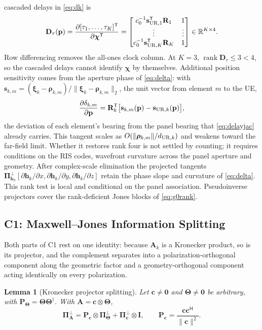 \documentclass[letterpaper,journal]{IEEEtran}
\newtheorem{lemma}{Lemma}
\newcommand{\R}{\mathbb{R}}
\newcommand{\bp}{\mathbf{p}}
\newcommand{\bc}{\mathbf{c}}
\newcommand{\bh}{\mathbf{h}}
\newcommand{\bs}{\mathbf{s}}
\newcommand{\bA}{\mathbf{A}}
\newcommand{\bD}{\mathbf{D}}
\newcommand{\bI}{\mathbf{I}}
\newcommand{\bP}{\mathbf{P}}
\newcommand{\bR}{\mathbf{R}}
\newcommand{\bTheta}{\boldsymbol{\Theta}}
\newcommand{\bPi}{\boldsymbol{\Pi}}
\newcommand{\brho}{\boldsymbol{\rho}}
\newcommand{\bchi}{\boldsymbol{\chi}}
\newcommand{\bxi}{\boldsymbol{\xi}}
\newcommand{\rank}{\operatorname{rank}}
\begin{document}
cascaded delays in \eqref{eq:dk} is
\begin{equation}
	\bD_\tau(\bp)
	=\frac{\partial[\tau_1,\ldots,\tau_K]^{\mathsf T}}
	{\partial\bchi^{\mathsf T}}
	=\begin{bmatrix}
	c_0^{-1}\bs_{{\rm UR},1}^{\mathsf T}\bR_1 & 1\\
	\vdots & \vdots\\
	c_0^{-1}\bs_{{\rm UR},K}^{\mathsf T}\bR_K & 1
	\end{bmatrix}\in\R^{K\times4}.
	\label{eq:delayjac}
\end{equation}
Row differencing removes the all-ones clock column. At $K=3$,
$\rank\bD_\tau\le3<4$, so the cascaded delays cannot identify $\bchi$ by
themselves. Additional position sensitivity comes from the aperture phase of
\eqref{eq:delta}: with
$\bs_{k,m}=(\bxi_k-\brho_{k,m})/\|\bxi_k-\brho_{k,m}\|_2$, the unit vector
from element $m$ to the UE,
\begin{equation}
	\frac{\partial\delta_{k,m}}{\partial\bp}
	=\bR_k^{\mathsf T}\big[\bs_{k,m}(\bp)-\bs_{{\rm UR},k}(\bp)\big],
	\label{eq:apertjac}
\end{equation}
the deviation of each element's bearing from the panel bearing that
\eqref{eq:delayjac} already carries. This tangent scales as
$O(\|\brho_{k,m}\|/d_{{\rm UR},k})$ and weakens toward the far-field limit.
Whether it restores rank four is not settled by counting; it requires
conditions on the RIS codes, wavefront curvature across the panel aperture
and geometry. After
complex-scale elimination the projected tangents
$\bPi_{\bh_k}^{\perp}[\partial\bh_k/\partial x,\partial\bh_k/\partial y,
\partial\bh_k/\partial z]$ retain the phase slope and curvature of
\eqref{eq:delta}. This rank test is local and conditional on the panel
association. Pseudoinverse projectors cover the rank-deficient Jones blocks of
\eqref{eq:g0rank}.

\subsection{C1: Maxwell--Jones Information Splitting}
Both parts of C1 rest on one identity: because $\bA_k$ is a Kronecker
product, so is its projector, and the complement separates into a
polarization-orthogonal component along the geometric factor and a
geometry-orthogonal component acting identically on every polarization.

\begin{lemma}[Kronecker projector splitting]
\label{lem:kron}
Let $\bc\neq\mathbf0$ and $\bTheta\neq\mathbf0$ be arbitrary, with
$\bP_{\bTheta}=\bTheta\bTheta^{\dagger}$. With $\bA=\bc\otimes\bTheta$,
\begin{equation}
 \bPi_{\bA}^{\perp}
 =\bP_{\bc}\otimes\bPi_{\bTheta}^{\perp}+\bPi_{\bc}^{\perp}\otimes\bI,
 \qquad \bP_{\bc}=\frac{\bc\bc^{\mathsf H}}{\|\bc\|^2}.
 \label{eq:kronsplit}
\end{equation}
\end{lemma}
\end{document}

